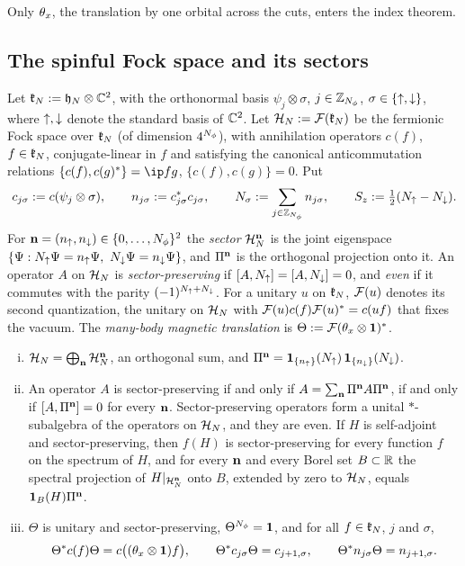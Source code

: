Only $\theta_x$, the translation by one orbital across the cuts, enters the index theorem.

\subsection{The spinful Fock space and its sectors}

\begin{definition}\label{def:fock}
Let $\mathfrak{k}_N:=\mathfrak{h}_N\otimes\mathbb{C}^2$, with the orthonormal basis $\psi_j\otimes\sigma$, $j\in\mathbb{Z}_{N_{\phi}}$,
$\sigma\in\{{\uparrow},{\downarrow}\}$, where ${\uparrow},{\downarrow}$ denote the standard basis of $\mathbb{C}^2$. Let $\mathcal{H}_N:=\mathcal{F}(\mathfrak{k}_N)$ be the
fermionic Fock space over $\mathfrak{k}_N$ (of dimension $4^{N_{\phi}}$), with annihilation operators $c(f)$, $f\in\mathfrak{k}_N$,
conjugate-linear in $f$ and satisfying the canonical anticommutation relations
$\{c(f),c(g)^*\}=\ip fg$, $\{c(f),c(g)\}=0$. Put
\[
c_{j\sigma}:=c(\psi_j\otimes\sigma),\qquad n_{j\sigma}:=c_{j\sigma}^*c_{j\sigma},\qquad
N_\sigma:=\sum_{j\in\mathbb{Z}_{N_{\phi}}}n_{j\sigma},\qquad S_z:=\tfrac12(N_{\uparrow}-N_{\downarrow}).
\]
For $\mathbf{n}=(n_{\uparrow},n_{\downarrow})\in\{0,\dots,N_{\phi}\}^2$ the \emph{sector} $\mathcal{H}_N^{\mathbf{n}}$ is the joint eigenspace
$\{\Psi:\Nup\Psi=n_\up\Psi,\ \Ndn\Psi=n_\dn\Psi\}$, and $\Pi^{\mathbf{n}}$ is the orthogonal projection onto it. An
operator $A$ on $\mathcal{H}_N$ is \emph{sector-preserving} if $[A,N_{\uparrow}]=[A,N_{\downarrow}]=0$, and \emph{even} if it commutes
with the parity $(-1)^{N_{\uparrow}+N_{\downarrow}}$. For a unitary $u$ on $\mathfrak{k}_N$, $\mathcal{F}(u)$ denotes its second quantization, the
unitary on $\mathcal{H}_N$ with $\mathcal{F}(u)c(f)\mathcal{F}(u)^*=c(uf)$ that fixes the vacuum. The \emph{many-body magnetic
translation} is $\Theta:=\mathcal{F}(\theta_x\otimes\mathbf{1})^*$.
\end{definition}

\begin{lemma}\label{lem:sectors}
\begin{enumerate}[(i)]
\item $\mathcal{H}_N=\bigoplus_{\mathbf{n}}\mathcal{H}_N^{\mathbf{n}}$, an orthogonal sum, and
$\Pi^{\mathbf{n}}=\mathbf{1}_{\{n_{\uparrow}\}}(N_{\uparrow})\,\mathbf{1}_{\{n_{\downarrow}\}}(N_{\downarrow})$.
\item An operator $A$ is sector-preserving if and only if $A=\sum_{\mathbf{n}}\Pi^{\mathbf{n}} A\Pi^{\mathbf{n}}$, if and only if
$[A,\Pi^{\mathbf{n}}]=0$ for every $\mathbf{n}$. Sector-preserving operators form a unital $*$-subalgebra of the operators on
$\mathcal{H}_N$, and they are even. If $H$ is self-adjoint and sector-preserving, then $f(H)$ is sector-preserving for
every function $f$ on the spectrum of $H$, and for every $\mathbf{n}$ and every Borel set $B\subset\mathbb{R}$ the spectral
projection of $H|_{\mathcal{H}_N^{\mathbf{n}}}$ onto $B$, extended by zero to $\mathcal{H}_N$, equals $\mathbf{1}_B(H)\Pi^{\mathbf{n}}$.
\item $\Theta$ is unitary and sector-preserving, $\Theta^{N_{\phi}}=\mathbf{1}$, and for all $f\in\mathfrak{k}_N$, $j$ and $\sigma$,
\[
\Theta^*c(f)\Theta=c\bigl((\theta_x\otimes\mathbf{1})f\bigr),\qquad\Theta^*c_{j\sigma}\Theta=c_{j+1,\sigma},\qquad
\Theta^*n_{j\sigma}\Theta=n_{j+1,\sigma}.
\]
\end{enumerate}
\end{lemma}

